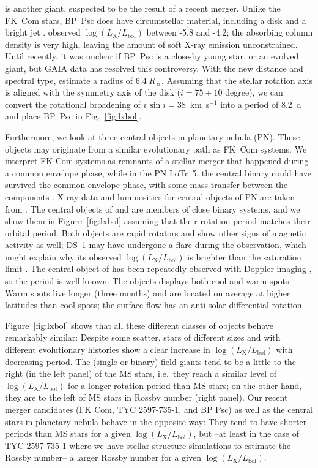 \documentclass[linenumbers]{aastex631}
\begin{document}
 is another giant, suspected to be the result of a recent merger. Unlike the FK~Com stars, BP~Psc does have circumstellar material, including a disk and a bright jet \citep{Zuckerman_2008}.
\citet{2010ApJ...719L..65K} observed $\log(L_\mathrm{X}/L_\mathrm{bol})$ between -5.8 and -4.2; the absorbing column density is very high, leaving the amount of soft X-ray emission unconstrained. Until recently, it was unclear if BP~Psc is a close-by young star, or an evolved giant, but GAIA data has resolved this controversy. With the new distance and spectral type, \citet{2019MNRAS.490.3158C} estimate a radius of $6.4\;R_\sun{}$. Assuming that the stellar rotation axis is aligned with the symmetry axis of the disk ($i=75\pm10$ degree), we can convert the rotational broadening of $v \sin i=38$~km~s$^{-1}$ \citep{Zuckerman_2008} into a period of 8.2~d and place BP~Psc in Fig.~\ref{fig:lxbol}.

Furthermore, we look at three central objects in planetary nebula (PN). These objects may originate from a similar evolutionary path as FK~Com systems. We interpret FK Com systems as remnants of a stellar merger that happened during a common envelope phase, while in the PN LoTr~5, the central binary could have survived the common envelope phase, with some mass transfer between the components \citep{1996A&A...307..200J}.
X-ray data and luminosities for central objects of PN are taken from \citet{2010ApJ...721.1820M}. The central objects of  and  are members of close binary systems, and we show them in Figure~\ref{fig:lxbol} assuming that their rotation period matches their orbital period. Both objects are rapid rotators and show other signs of magnetic activity as well; DS~1 may have undergone a flare during the observation, which might explain why its observed $\log(L_\mathrm{X}/L_\mathrm{bol})$ is brighter than the saturation limit \citep{2010ApJ...721.1820M}. The central object of  has been repeatedly observed with Doppler-imaging \citep{2019A&A...624A..83K}, so the period is well known. The objects displays both cool and warm spots. Warm spots live longer (three months) and are located on average at higher latitudes than cool spots; the surface flow has an anti-solar differential rotation.

Figure~\ref{fig:lxbol} shows that all these different classes of objects behave remarkably similar: Despite some scatter, stars of different sizes and with different evolutionary histories show a clear increase in $\log(L_\mathrm{X}/L_\mathrm{bol})$ with decreasing period. The (single or binary) field giants tend to be a little to the right (in the left panel) of the MS stars, i.e.\ they reach a similar level of $\log(L_\mathrm{X}/L_\mathrm{bol})$ for a longer rotation period than MS stars; on the other hand, they are to the left of MS stars in Rossby number (right panel). Our recent merger candidates (FK Com, TYC 2597-735-1, and BP Psc) as well as the central stars in planetary nebula behave in the opposite way: They tend to have shorter periods than MS stars for a given $\log(L_\mathrm{X}/L_\mathrm{bol})$, but --at least in the case of TYC 2597-735-1 where we have stellar structure simulations to estimate the Rossby number-- a larger Rossby number for a given $\log(L_\mathrm{X}/L_\mathrm{bol})$.
\end{document}
